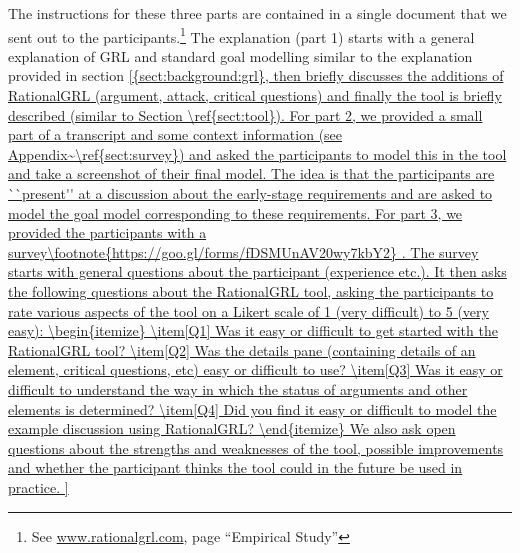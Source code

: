 The instructions for these three parts are contained in a single document that we sent out to the participants.\footnote{See \url{www.rationalgrl.com}, page ``Empirical Study''} The explanation (part 1) starts with a general explanation of GRL and standard goal modelling similar to the explanation provided in section \ref{{sect:background:grl}, then briefly discusses the additions of RationalGRL (argument, attack, critical questions) and finally the tool is briefly described (similar to Section \ref{sect:tool}). 

For part 2, we provided a small part of a transcript and some context information (see Appendix~\ref{sect:survey}) and asked the participants to model this in the tool and take a screenshot of their final model. The idea is that the participants are ``present'' at a discussion about the early-stage requirements and are asked to model the goal model corresponding to these requirements. 

For part 3, we provided the participants with a survey\footnote{https://goo.gl/forms/fDSMUnAV20wy7kbY2} . The survey starts with general questions about the participant (experience etc.). It then asks the following questions about the RationalGRL tool, asking the participants to rate various aspects of the tool on a Likert scale of 1 (very difficult) to 5 (very easy):
\begin{itemize}
\item[Q1] Was it easy or difficult to get started with the RationalGRL tool?
\item[Q2] Was the details pane (containing details of an element, critical questions, etc) easy or difficult to use?
\item[Q3] Was it easy or difficult to understand the way in which the status of arguments and other elements is determined?
\item[Q4] Did you find it easy or difficult to model the example discussion using RationalGRL?
\end{itemize}
We also ask open questions about the strengths and weaknesses of the tool, possible improvements and whether the participant thinks the tool could in the future be used in practice.

}
